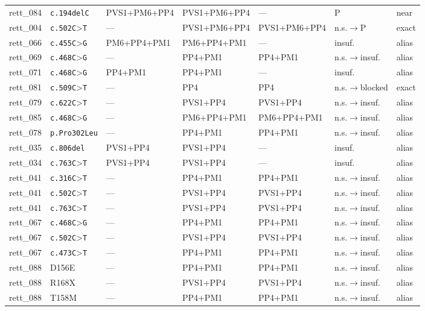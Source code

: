 \documentclass[12pt]{article}
\begin{document}
\begin{table}[htbp]
\begin{tabular}{@{}llp{2.35cm}p{2.35cm}p{2.0cm}p{2.35cm}l@{}}
    rett\_084 & \texttt{c.194delC} &
      PVS1+\allowbreak PM6+\allowbreak PP4 & PVS1+\allowbreak PM6+\allowbreak PP4 & --- &
      P & near \\
    rett\_004 & \texttt{c.502C}\textgreater\texttt{T} & --- &
      PVS1+\allowbreak PM6+\allowbreak PP4 & PVS1+\allowbreak PM6+\allowbreak PP4 &
      n.s.$\to$P & exact \\
    rett\_066 & \texttt{c.455C}\textgreater\texttt{G} &
      PM6+\allowbreak PP4+\allowbreak PM1 & PM6+\allowbreak PP4+\allowbreak PM1 & --- &
      insuf. & alias \\
    rett\_069 & \texttt{c.468C}\textgreater\texttt{G} & --- & PP4+PM1 & PP4+PM1 &
      n.s.$\to$insuf. & alias \\
    rett\_071 & \texttt{c.468C}\textgreater\texttt{G} & PP4+PM1 & PP4+PM1 & --- &
      insuf. & alias \\
    rett\_081 & \texttt{c.509C}\textgreater\texttt{T} & --- & PP4 & PP4 &
      n.s.$\to$blocked & exact \\
    rett\_079 & \texttt{c.622C}\textgreater\texttt{T} & --- & PVS1+PP4 & PVS1+PP4 &
      n.s.$\to$insuf. & alias \\
    rett\_085 & \texttt{c.468C}\textgreater\texttt{G} & --- &
      PM6+\allowbreak PP4+\allowbreak PM1 & PM6+\allowbreak PP4+\allowbreak PM1 &
      n.s.$\to$insuf. & alias \\
    rett\_078 & \texttt{p.Pro302Leu} & --- & PP4+PM1 & PP4+PM1 &
      n.s.$\to$insuf. & alias \\
    rett\_035 & \texttt{c.806del} & PVS1+PP4 & PVS1+PP4 & --- &
      insuf. & alias \\
    rett\_034 & \texttt{c.763C}\textgreater\texttt{T} & PVS1+PP4 & PVS1+PP4 & --- &
      insuf. & alias \\
    rett\_041 & \texttt{c.316C}\textgreater\texttt{T} & --- & PP4+PM1 & PP4+PM1 &
      n.s.$\to$insuf. & alias \\
    rett\_041 & \texttt{c.502C}\textgreater\texttt{T} & --- & PVS1+PP4 & PVS1+PP4 &
      n.s.$\to$insuf. & alias \\
    rett\_041 & \texttt{c.763C}\textgreater\texttt{T} & --- & PVS1+PP4 & PVS1+PP4 &
      n.s.$\to$insuf. & alias \\
    rett\_067 & \texttt{c.468C}\textgreater\texttt{G} & --- & PP4+PM1 & PP4+PM1 &
      n.s.$\to$insuf. & alias \\
    rett\_067 & \texttt{c.502C}\textgreater\texttt{T} & --- & PVS1+PP4 & PVS1+PP4 &
      n.s.$\to$insuf. & alias \\
    rett\_067 & \texttt{c.473C}\textgreater\texttt{T} & --- & PP4+PM1 & PP4+PM1 &
      n.s.$\to$insuf. & alias \\
    rett\_088 & D156E & --- & PP4+PM1 & PP4+PM1 &
      n.s.$\to$insuf. & alias \\
    rett\_088 & R168X & --- & PVS1+PP4 & PVS1+PP4 &
      n.s.$\to$insuf. & alias \\
    rett\_088 & T158M & --- & PP4+PM1 & PP4+PM1 &
      n.s.$\to$insuf. & alias \\
    \bottomrule
  \end{tabular}
\end{table}
\end{document}
